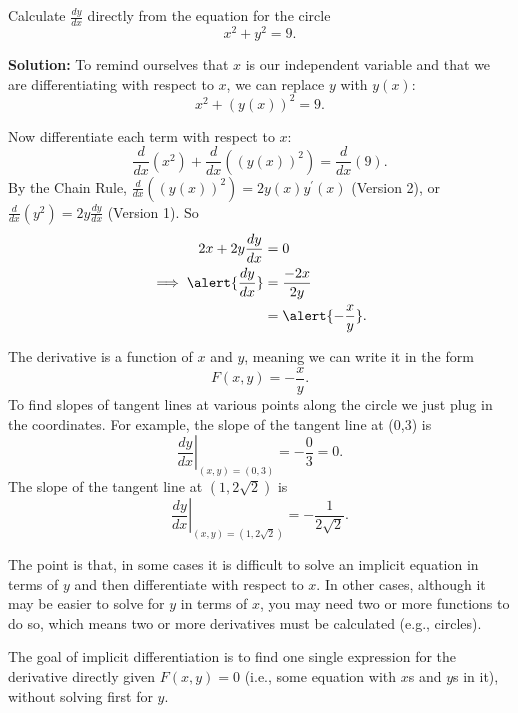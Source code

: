\documentclass[cal1spr16Lectures.tex]{subfiles}
\begin{document}
\begin{frame}{}
\begin{ex} Calculate $\textstyle\frac{dy}{dx}$ directly from the equation for the circle 
\[x^2 + y^2 = 9.\]
\end{ex}
{\bf Solution:}  To remind ourselves that $x$ is our independent variable and that we are differentiating with respect to $x$, we can replace $y$ with $y(x)$:
\[x^2 + (y(x))^2 = 9.\]
\end{frame}

\begin{frame}\footnotesize
Now differentiate each term with respect to $x$:
\[\frac{d}{dx} (x^2) + \frac{d}{dx} ((y(x))^2) = \frac{d}{dx}(9).\]
By the Chain Rule, $\textstyle\frac{d}{dx}((y(x))^2)=2y(x) y^{\prime}(x)$ (Version 2), or $\textstyle\frac{d}{dx}(y^2)=2y \frac{dy}{dx}$ (Version 1).  So 
\begin{align*}
2x+2y \frac{dy}{dx} &= 0 \\
\implies \alert{\frac{dy}{dx}} &= \frac{-2x}{2y} \\
	&= \alert{-\frac{x}{y}}.
\end{align*}
\end{frame}

\begin{frame}\footnotesize
The derivative is a function of $x$ and $y$, meaning we can write it in the form 
\[F(x,y)=-\frac{x}{y}.\] 
To find slopes of tangent lines at various points along the circle we just plug in the coordinates.  For example, the slope of the tangent line at (0,3) is 
\[\left. \frac{dy}{dx} \right|_{(x,y)=(0,3)} = -\frac{0}{3}=0.\]
The slope of the tangent line at $(1,2\sqrt{2})$ is
\[\left. \frac{dy}{dx} \right|_{(x,y)=(1,2\sqrt{2})} = -\frac{1}{2\sqrt{2}}.\]
\end{frame}

\begin{frame}\footnotesize
The point is that, in some cases it is difficult to solve an implicit equation in terms of $y$ and then differentiate with respect to $x$.  In other cases, although it may be easier to solve for $y$ in terms of $x$, you may need two or more functions to do so, which means two or more derivatives must be calculated (e.g., circles).

\vspace{1pc}
The goal of implicit differentiation is to find one single expression for the derivative directly given $F(x,y)=0$ (i.e., some equation with $x$s and $y$s in it), without solving first for $y$.
\end{frame}
\end{document}
